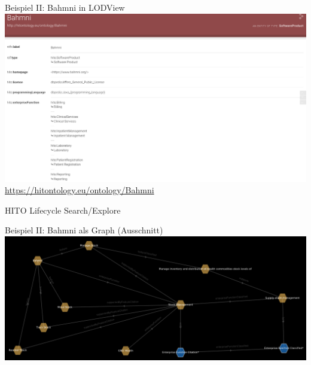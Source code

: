 \documentclass[aspectratio=1610,12pt]{beamer}
\begin{document}
\begin{frame}{Beispiel II: Bahmni in LODView}
  \vspace{-0.3cm}
  \centering
  \includegraphics[width=.95\textwidth]{img/bahmni.png}
  \footnotesize{\url{https://hitontology.eu/ontology/Bahmni}}
\end{frame}

\begin{frame}{HITO Lifecycle Search/Explore}
  \centering
  \vspace{-0.5cm}
\end{frame}

%

\begin{frame}{Beispiel II: Bahmni als Graph (Ausschnitt)}
  \includegraphics[width=\textwidth, height=.65\textheight]{img/bahmni_star.png}
\end{frame}
\end{document}
